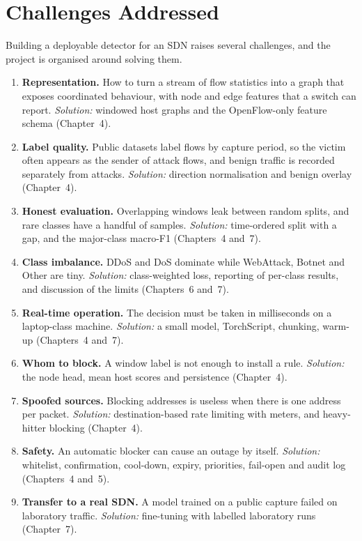 \section{Challenges Addressed}
Building a deployable detector for an SDN raises several challenges, and the project is organised around solving them.
\begin{enumerate}
	\item \textbf{Representation.} How to turn a stream of flow statistics into a graph that exposes coordinated behaviour, with node and edge features that a switch can report. \emph{Solution:} windowed host graphs and the OpenFlow-only feature schema (Chapter~4).
	\item \textbf{Label quality.} Public datasets label flows by capture period, so the victim often appears as the sender of attack flows, and benign traffic is recorded separately from attacks. \emph{Solution:} direction normalisation and benign overlay (Chapter~4).
	\item \textbf{Honest evaluation.} Overlapping windows leak between random splits, and rare classes have a handful of samples. \emph{Solution:} time-ordered split with a gap, and the major-class macro-F1 (Chapters~4 and~7).
	\item \textbf{Class imbalance.} DDoS and DoS dominate while WebAttack, Botnet and Other are tiny. \emph{Solution:} class-weighted loss, reporting of per-class results, and discussion of the limits (Chapters~6 and~7).
	\item \textbf{Real-time operation.} The decision must be taken in milliseconds on a laptop-class machine. \emph{Solution:} a small model, TorchScript, chunking, warm-up (Chapters~4 and~7).
	\item \textbf{Whom to block.} A window label is not enough to install a rule. \emph{Solution:} the node head, mean host scores and persistence (Chapter~4).
	\item \textbf{Spoofed sources.} Blocking addresses is useless when there is one address per packet. \emph{Solution:} destination-based rate limiting with meters, and heavy-hitter blocking (Chapter~4).
	\item \textbf{Safety.} An automatic blocker can cause an outage by itself. \emph{Solution:} whitelist, confirmation, cool-down, expiry, priorities, fail-open and audit log (Chapters~4 and~5).
	\item \textbf{Transfer to a real SDN.} A model trained on a public capture failed on laboratory traffic. \emph{Solution:} fine-tuning with labelled laboratory runs (Chapter~7).
\end{enumerate}


